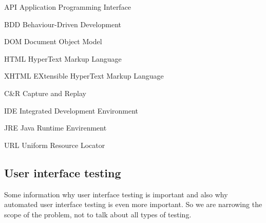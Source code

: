 \documentclass[12pt,a4paper,english%
]{tutthesis}
\begin{document}
\begin{termlist}
\item [API] Application Programming Interface
\item [BDD] Behaviour-Driven Development
\item [DOM] Document Object Model
\item [HTML] HyperText Markup Language
\item [XHTML] EXtensible HyperText Markup Language
\item [C\&R]Capture and Replay
\item [IDE] Integrated Development Environment
\item [JRE] Java Runtime Envirenment
\item [URL] Uniform Resource Locator

\end{termlist} 


\cleardoublepage

\newpage             %
\setcounter{page}{1} %
\renewcommand{\chaptername}{} %




 


\iffalse  
	\subsection{User interface testing}	
		Some information why user interface testing is important and also why
		automated user interface testing is even more important. So we are narrowing
		the scope of the problem, not to talk about all types of testing.
\end{document}
